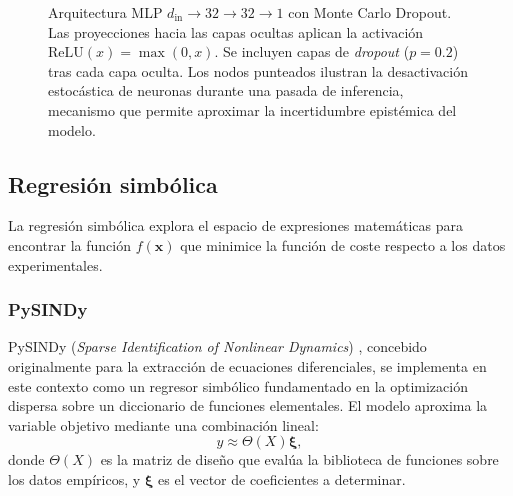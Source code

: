 \documentclass[11pt, a4paper]{article}
\begin{document}
\begin{figure}[h]
    \shorthandon{>}
    \caption{Arquitectura MLP $d_{\text{in}} \rightarrow 32 \rightarrow 32 \rightarrow 1$ con Monte Carlo Dropout. Las proyecciones hacia las capas ocultas aplican la activación $\text{ReLU}(x) = \max(0, x)$. Se incluyen capas de \textit{dropout} ($p=0.2$) tras cada capa oculta. Los nodos punteados ilustran la desactivación estocástica de neuronas durante una pasada de inferencia, mecanismo que permite aproximar la incertidumbre epistémica del modelo.}
    \label{fig:mlp_mcdropout}
\end{figure}

\subsection{Regresión simbólica}

La regresión simbólica explora el espacio de expresiones matemáticas para encontrar la función $f(\mathbf{x})$ que minimice la función de coste respecto a los datos experimentales.




\subsubsection{PySINDy}

PySINDy (\textit{Sparse Identification of Nonlinear Dynamics}) \cite{brunton2016discovering}, concebido originalmente para la extracción de ecuaciones diferenciales, se implementa en este contexto como un regresor simbólico fundamentado en la optimización dispersa sobre un diccionario de funciones elementales. El modelo aproxima la variable objetivo mediante una combinación lineal:
\begin{equation}
y \approx \Theta(X) \boldsymbol{\xi},\end{equation}
donde $\Theta(X)$ es la matriz de diseño que evalúa la biblioteca de funciones sobre los datos empíricos, y $\boldsymbol{\xi}$ es el vector de coeficientes a determinar.
\end{document}
